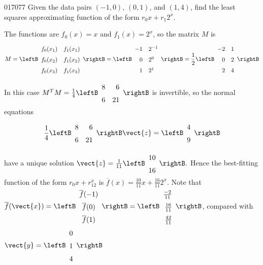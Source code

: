 \begin{example}{}{017077}
Given the data pairs $(-1, 0)$, $(0, 1)$, and $(1, 4)$, find the least squares approximating function of the form $r_{0}x + r_{1}2^{x}$.

\begin{solution}
The functions are $f_{0}(x) = x$ and $f_{1}(x) = 2^{x}$, so the matrix $M$ is
\begin{equation*}
M = \leftB \begin{array}{cc}
f_0(x_1) & f_1(x_1) \\
f_0(x_2) & f_1(x_2) \\
f_0(x_3) & f_1(x_3)
\end{array} \rightB
= \leftB \begin{array}{rl}
-1 & 2^{-1} \\
0 & 2^0 \\
1 & 2^1
\end{array} \rightB
=\frac{1}{2} \leftB \begin{array}{rr}
-2 & 1 \\
0 & 2 \\
2 & 4
\end{array} \rightB
\end{equation*}
In this case $M^TM = \frac{1}{4}
\leftB \begin{array}{rr}
8 & 6 \\
6 & 21
\end{array} \rightB$ is invertible, so the normal equations
\begin{equation*}
\frac{1}{4}
\leftB \begin{array}{rr}
8 & 6 \\
6 & 21
\end{array} \rightB
\vect{z} = 
\leftB \begin{array}{r}
4 \\
9 
\end{array} \rightB
\end{equation*}
have a unique solution $\vect{z} = \frac{1}{11}
\leftB \begin{array}{r}
10 \\
16
\end{array} \rightB.$ Hence the best-fitting function of the form $r_0x + r_12^x$ is $\overline{f}(x) = \frac{10}{11}x + \frac{16}{11}2^x$. Note that $\overline{f}(\vect{x}) =
\leftB \begin{array}{c}
	\overline{f}(-1) \\
	\overline{f}(0) \\
	\overline{f}(1) \\
\end{array} \rightB
= \def\arraystretch{1.5}
\leftB \begin{array}{r}
\frac{-2}{11} \\
\frac{16}{11} \\
\frac{42}{11}
\end{array} \rightB$, compared with $\vect{y} = 
\leftB \begin{array}{r}
0 \\
1 \\
4
\end{array} \rightB$
\end{solution}
\end{example}
